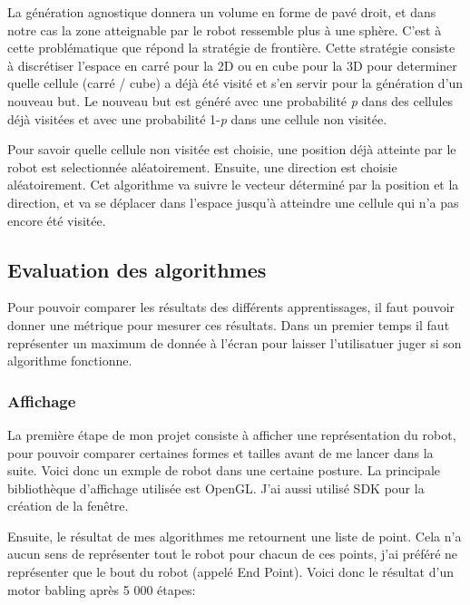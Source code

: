 \documentclass[11pt,french]{article}
\begin{document}
La génération agnostique donnera un volume en forme de pavé droit, et dans notre cas la zone atteignable par le robot ressemble plus à une sphère. C'est à cette problématique que répond la stratégie de frontière. Cette stratégie consiste à discrétiser l'espace en carré pour la 2D ou en cube pour la 3D pour determiner quelle cellule (carré / cube) a déjà été visité et s'en servir pour la génération d'un nouveau but. Le nouveau but est généré avec une probabilité \emph{p} dans des cellules déjà visitées et avec une probabilité 1-\emph{p} dans une cellule non visitée.

Pour savoir quelle cellule non visitée est choisie, une position déjà atteinte par le robot est selectionnée aléatoirement. Ensuite, une direction est choisie aléatoirement. Cet algorithme va suivre le vecteur déterminé par la position et la direction, et va se déplacer dans l'espace jusqu'à atteindre une cellule qui n'a pas encore été visitée.

\subsection{Evaluation des algorithmes}

Pour pouvoir comparer les résultats des différents apprentissages, il faut pouvoir donner une métrique pour mesurer ces résultats. Dans un premier temps il faut représenter un maximum de donnée à l'écran pour laisser l'utilisatuer juger si son algorithme fonctionne.

\subsubsection{Affichage}

La première étape de mon projet consiste à afficher une représentation du robot, pour pouvoir comparer certaines formes et tailles avant de me lancer dans la suite. Voici donc un exmple de robot dans une certaine posture. La principale bibliothèque d'affichage utilisée est OpenGL. J'ai aussi utilisé SDK pour la création de la fenêtre.


Ensuite, le résultat de mes algorithmes me retournent une liste de point. Cela n'a aucun sens de représenter tout le robot pour chacun de ces points, j'ai préféré ne représenter que le bout du robot (appelé End Point). Voici donc le résultat d'un motor babling après 5 000 étapes:

\end{document}
